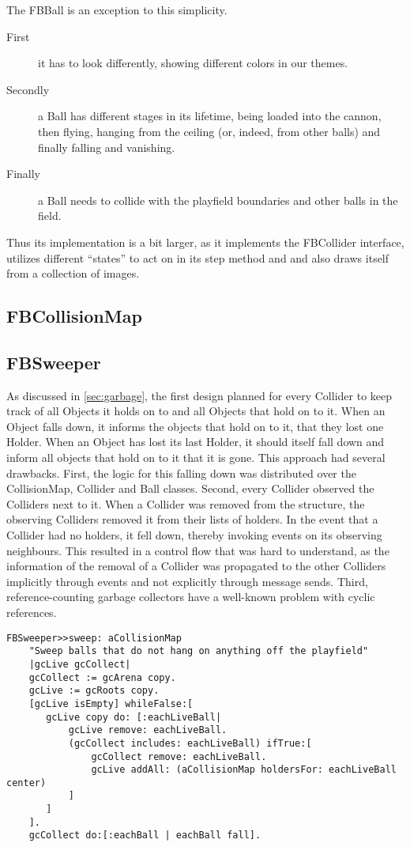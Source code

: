 The FBBall is an exception to this simplicity. 
\begin{description}
  \item[First]
    	it has to look 
	differently, showing different colors in our themes. 
  \item[Secondly]
    	a Ball has different stages in its lifetime, being 
	loaded into the cannon, then flying, hanging from the 
	ceiling (or, indeed, from other balls) and finally falling 
	and vanishing.
  \item[Finally]
    	a Ball needs to collide with the playfield boundaries and 
	other balls in the field.
\end{description}
Thus its implementation is a bit larger, as it implements the FBCollider 
interface, utilizes different ``states'' to act on in its step method and 
and also draws itself from a collection of images.
%
\subsection{FBCollisionMap}
%
\subsection{FBSweeper}
As discussed in \ref{sec:garbage}, the first design planned for every Collider to keep track of all Objects it holds on to and all Objects that hold on to it. When an Object falls down, it informs the objects that hold on to it, that they lost one Holder. When an Object has lost its last Holder, it should itself fall down and inform all objects that hold on to it that it is gone.
This approach had several drawbacks. First, the logic for this falling down was distributed over the CollisionMap, Collider and Ball classes.
Second, every Collider observed the Colliders next to it. When a Collider was removed from the structure, the observing Colliders removed it from their lists of holders. In the event that a Collider had no holders, it fell down, thereby invoking events on its observing neighbours.
This resulted in a control flow that was hard to understand, as the information of the removal of a Collider was propagated to the other Colliders implicitly through events and not explicitly through message sends.
Third, reference-counting garbage collectors have a well-known problem with cyclic references. 

\begin{lstlisting}[language=Smalltalk]
FBSweeper>>sweep: aCollisionMap
    "Sweep balls that do not hang on anything off the playfield"
    |gcLive gcCollect|
    gcCollect := gcArena copy.
    gcLive := gcRoots copy.
    [gcLive isEmpty] whileFalse:[
       gcLive copy do: [:eachLiveBall|
           gcLive remove: eachLiveBall.
           (gcCollect includes: eachLiveBall) ifTrue:[
               gcCollect remove: eachLiveBall.
               gcLive addAll: (aCollisionMap holdersFor: eachLiveBall center)
           ]
       ]
    ].
    gcCollect do:[:eachBall | eachBall fall].
\end{lstlisting}




